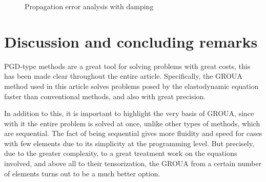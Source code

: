 \documentclass{ws-m3as}
\begin{document}
\begin{figure}
 \centering
 \caption{Propagation error analysis with damping}
 \label{PropErrorAmort}
\end{figure}






\section{Discussion and concluding remarks}

PGD-type methods are a great tool for solving problems with great costs, this has been made clear throughout the entire article. Specifically, the GROUA method used in this article solves problems posed by the elastodynamic equation faster than conventional methods, and also with great precision.

In addition to this, it is important to highlight the very basis of GROUA, since with it the entire problem is solved at once, unlike other types of methods, which are sequential. The fact of being sequential gives more fluidity and speed for cases with few elements due to its simplicity at the programming level. But precisely, due to the greater complexity, to a great treatment work on the equations involved, and above all to their tensorization, the GROUA from a certain number of elements turns out to be a much better option.\\
\end{document}
